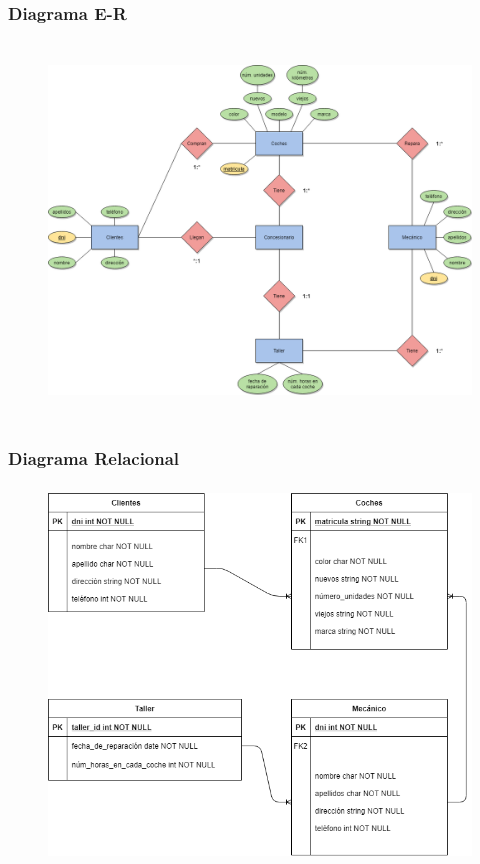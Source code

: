 \documentclass[a4paper, 12pt]{article}
\begin{document}
\begin{justify}
        \subsubsection{Diagrama E-R}
        \begin{figure}[H]
            \centering
            \includegraphics[width=16cm,height=10cm]{er4.png}
        \end{figure}
        \subsubsection{Diagrama Relacional}
        \begin{figure}[H]
            \centering
            \includegraphics[width=16cm,height=10cm]{rel4.png}
        \end{figure}

\end{justify}
\end{document}
